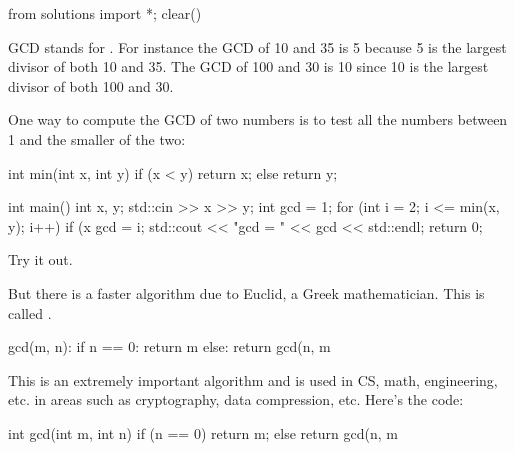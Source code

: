 \begin{python0}
from solutions import *; clear()
\end{python0}

GCD stands for . For instance the GCD of
10 and 35 is 5 because 5 is the largest divisor of both 10 and 35. The
GCD of 100 and 30 is 10 since 10 is the largest divisor of both 100 and
30.

One way to compute the GCD of two numbers is to test all the numbers
between 1 and the smaller of the two:

\begin{consolethree}[escapeinside=||]
int min(int x, int y)
{
    if (x < y)
        return x;
    else
        return y;
}

int main()
{
    int x, y;
    std::cin >> x >> y;
    int gcd = 1;
    for (int i = 2; i <= min(x, y); i++)
    {
        if (x %
        {
            gcd = i;
        }
    }
    std::cout << "gcd = " << gcd << std::endl;
    return 0;
}
\end{consolethree}

Try it out.

But there is a faster algorithm due to Euclid, a Greek mathematician.
This is called .

\begin{consolethree}
gcd(m, n):
    if n == 0:
        return m
    else:
        return gcd(n, m %
\end{consolethree}

This is an extremely important algorithm and is used in CS, math,
engineering, etc. in areas such as cryptography, data compression, etc.
Here's the code:

\begin{consolethree}[escapeinside=||]
int gcd(int m, int n)
{
    if (n == 0)
        return m;
    else
        return gcd(n, m %
}
\end{consolethree}





